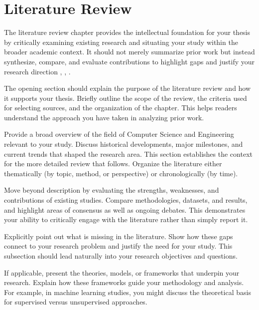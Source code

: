 %

\chapter{Literature Review}
\label{ch:lit-review}

The literature review chapter provides the intellectual foundation for your thesis by critically examining existing research and situating your study within the broader academic context. It should not merely summarize prior work but instead synthesize, compare, and evaluate contributions to highlight gaps and justify your research direction \cite{hawaii2023}, \cite{cmu2022}, \cite{harvard2023}.

The opening section should explain the purpose of the literature review and how it supports your thesis. Briefly outline the scope of the review, the criteria used for selecting sources, and the organization of the chapter. This helps readers understand the approach you have taken in analyzing prior work.

Provide a broad overview of the field of Computer Science and Engineering relevant to your study. Discuss historical developments, major milestones, and current trends that shaped the research area. This section establishes the context for the more detailed review that follows. Organize the literature either thematically (by topic, method, or perspective) or chronologically (by time).

Move beyond description by evaluating the strengths, weaknesses, and contributions of existing studies. Compare methodologies, datasets, and results, and highlight areas of consensus as well as ongoing debates. This demonstrates your ability to critically engage with the literature rather than simply report it.

Explicitly point out what is missing in the literature. Show how these gaps connect to your research problem and justify the need for your study. This subsection should lead naturally into your research objectives and questions.

If applicable, present the theories, models, or frameworks that underpin your research. Explain how these frameworks guide your methodology and analysis. For example, in machine learning studies, you might discuss the theoretical basis for supervised versus unsupervised approaches.

